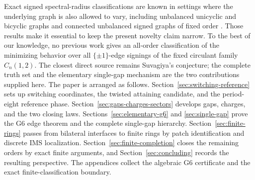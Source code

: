 Exact signed spectral-radius classifications are known in settings where the
underlying graph is also allowed to vary, including unbalanced unicyclic and
bicyclic graphs \cite{BelardoBrunettiCiampella2021} and connected unbalanced
signed graphs of fixed order \cite{BrunettiStanic2022}.  Those results make it
essential to keep the present novelty claim narrow.  To the best of our
knowledge, no previous work gives an all-order classification of the
minimizing behavior over all \(\{\pm1\}\)-edge signings of the fixed circulant family
\(C_n(1,2)\).  The closest direct source remains Suvagiya's conjecture; the
complete truth set and the elementary single-gap mechanism are the two
contributions supplied here.  The paper is arranged as follows.
Section~\ref{sec:switching-reference}
sets up switching coordinates, the twisted attaining candidate, and the
period-eight reference phase.  Section~\ref{sec:gaps-charges-sectors}
develops gaps, charges, and the two closing laws.  Sections~\ref{sec:elementary-g6}
and \ref{sec:single-gap} prove the G6 edge theorem and the complete
single-gap hierarchy.  Section~\ref{sec:finite-rings} passes from bilateral
interfaces to finite rings by patch identification and discrete IMS
localization.  Section~\ref{sec:finite-completion} closes the remaining
orders by exact finite arguments, and Section~\ref{sec:concluding} records
the resulting perspective.  The appendices collect the algebraic G6
certificate and the exact finite-classification boundary.
